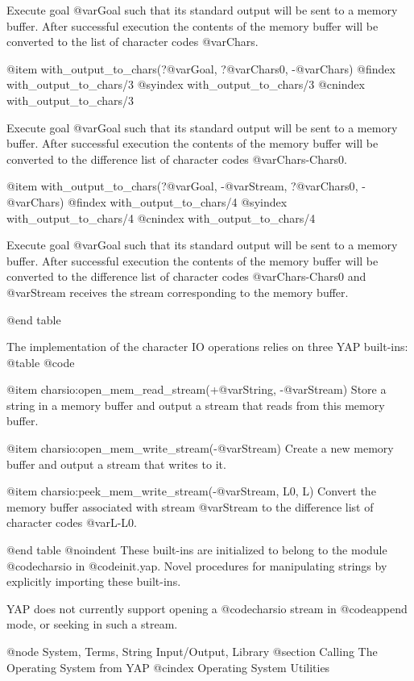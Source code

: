 Execute goal @var{Goal} such that its standard output will be sent to a
memory buffer. After successful execution the contents of the memory
buffer will be converted to the list of character codes @var{Chars}.

@item with_output_to_chars(?@var{Goal}, ?@var{Chars0}, -@var{Chars})
@findex with_output_to_chars/3
@syindex with_output_to_chars/3
@cnindex with_output_to_chars/3

Execute goal @var{Goal} such that its standard output will be sent to a
memory buffer. After successful execution the contents of the memory
buffer will be converted to the difference list of character codes
@var{Chars-Chars0}.

@item with_output_to_chars(?@var{Goal}, -@var{Stream}, ?@var{Chars0}, -@var{Chars})
@findex with_output_to_chars/4
@syindex with_output_to_chars/4
@cnindex with_output_to_chars/4

Execute goal @var{Goal} such that its standard output will be sent to a
memory buffer. After successful execution the contents of the memory
buffer will be converted to the difference list of character codes
@var{Chars-Chars0} and @var{Stream} receives the stream corresponding to
the memory buffer.

@end table

The implementation of the character IO operations relies on three YAP
built-ins:
@table @code

@item charsio:open_mem_read_stream(+@var{String}, -@var{Stream})
Store a string in a memory buffer and output a stream that reads from this
memory buffer.

@item charsio:open_mem_write_stream(-@var{Stream})
Create a new memory buffer and output a stream that writes to  it.

@item charsio:peek_mem_write_stream(-@var{Stream}, L0, L)
Convert the memory buffer associated with stream @var{Stream} to the
difference list of character codes @var{L-L0}.

@end table
@noindent
These built-ins are initialized to belong to the module @code{charsio} in
@code{init.yap}. Novel procedures for manipulating strings by explicitly
importing these built-ins.

YAP does not currently support opening a @code{charsio} stream in
@code{append} mode, or seeking in such a stream.

@node System, Terms, String Input/Output, Library
@section Calling The Operating System from YAP
@cindex Operating System Utilities

